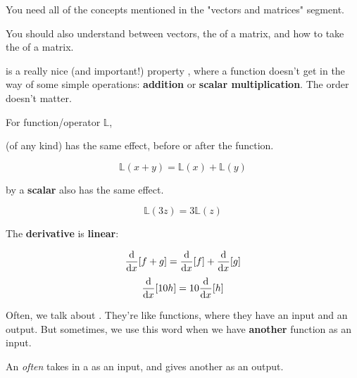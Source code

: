     You need all of the concepts mentioned in the "vectors and matrices" segment.

    You should also understand  between vectors, the  of a matrix, and how to take the  of a matrix. 
    
     is a really nice (and important!) property , where a function doesn't get in the way of some simple operations: \textbf{addition} or \textbf{scalar multiplication}. The order doesn't matter.\\
    
        \begin{definition}
            For  function/operator $\mathbb{L}$,
            
             (of any kind) has the same effect, before or after the function.
            
            \begin{equation*}
                \mathbb{L}(x+y) = \mathbb{L}(x) + \mathbb{L}(y)
            \end{equation*}
            
             by a \textbf{scalar} also has the same effect.
            
            \begin{equation*}
                \mathbb{L}(3z) = 3\mathbb{L}(z)
            \end{equation*}
            
        \end{definition}
    
    \miniex The \textbf{derivative} is \textbf{linear}: 
    
        \begin{equation}
            \frac{\dd }{\dd x}[f+g] = \frac{\dd }{\dd x}[f]+\frac{\dd }{\dd x}[g]
        \end{equation}
        \begin{equation}
            \frac{\dd }{\dd x}[10h]=10\frac{\dd }{\dd x}[h]
        \end{equation}
    
    Often, we talk about . They're like functions, where they have an input and an output. But sometimes, we use this word when we have \textbf{another} function as an input.\\
    
        \begin{definition}
            An  \textit{often} takes in a  as an input, and gives another  as an output.
        \end{definition}
        

